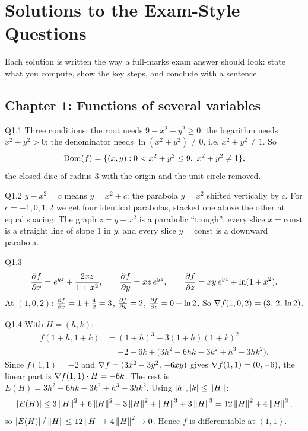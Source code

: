 \clearpage
{}\renewcommand{\tabname}{A}
\chapter{Solutions to the Exam-Style Questions}\label{app:sol}

Each solution is written the way a full-marks exam answer should look: state what you compute,
show the key steps, and conclude with a sentence.

\section{Chapter 1: Functions of several variables}

\begin{solution}{Q1.1}
Three conditions: the root needs $9-x^2-y^2\ge0$; the logarithm needs $x^2+y^2>0$; the
denominator needs $\ln(x^2+y^2)\neq0$, i.e. $x^2+y^2\neq1$. So
\[ \Dom(f)=\{(x,y):0<x^2+y^2\le9,\ x^2+y^2\neq1\}, \]
the closed disc of radius $3$ with the origin and the unit circle removed.
\end{solution}

\begin{solution}{Q1.2}
$y-x^2=c$ means $y=x^2+c$: the parabola $y=x^2$ shifted vertically by $c$. For $c=-1,0,1,2$ we get
four identical parabolas, stacked one above the other at equal spacing. The graph $z=y-x^2$ is a
parabolic ``trough'': every slice $x=\text{const}$ is a straight line of slope $1$ in $y$, and every slice
$y=\text{const}$ is a downward parabola.
\end{solution}

\begin{solution}{Q1.3}
\[
\frac{\partial f}{\partial x}=e^{yz}+\frac{2xz}{1+x^2},\qquad \frac{\partial f}{\partial y}=xz\,e^{yz},\qquad \frac{\partial f}{\partial z}=xy\,e^{yz}+\ln(1+x^2).
\]
At $(1,0,2)$: $\frac{\partial f}{\partial x}=1+\frac{4}{2}=3$, $\frac{\partial f}{\partial y}=2$, $\frac{\partial f}{\partial z}=0+\ln2$. So $\nabla f(1,0,2)=(3,\,2,\,\ln2)$.
\end{solution}

\begin{solution}{Q1.4}
With $H=(h,k)$:
\begin{align*}
f(1+h,1+k)&=(1+h)^3-3(1+h)(1+k)^2\\
&=-2-6k+\big(3h^2-6hk-3k^2+h^3-3hk^2\big).
\end{align*}
Since $f(1,1)=-2$ and $\nabla f=(3x^2-3y^2,\,-6xy)$ gives $\nabla f(1,1)=(0,-6)$, the linear part is
$\nabla f(1,1)\cdot H=-6k$. The rest is $E(H)=3h^2-6hk-3k^2+h^3-3hk^2$. Using $\left\lvert h\right\rvert,\left\lvert k\right\rvert\le\left\lVert H\right\rVert$:
\[ \left\lvert E(H)\right\rvert\le3\left\lVert H\right\rVert^2+6\left\lVert H\right\rVert^2+3\left\lVert H\right\rVert^2+\left\lVert H\right\rVert^3+3\left\lVert H\right\rVert^3=12\left\lVert H\right\rVert^2+4\left\lVert H\right\rVert^3, \]
so $\left\lvert E(H)\right\rvert/\left\lVert H\right\rVert\le12\left\lVert H\right\rVert+4\left\lVert H\right\rVert^2\to0$. Hence $f$ is differentiable at $(1,1)$.
\end{solution}

